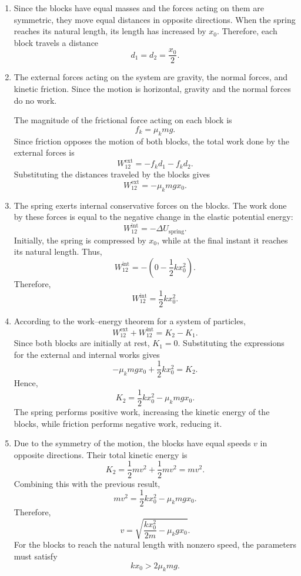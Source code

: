 \documentclass[12pt]{article}
\begin{document}
\begin{enumerate}
    \item Since the blocks have equal masses and the forces acting on them are symmetric, they move equal distances in opposite directions. When the spring reaches its natural length, its length has increased by $x_0$. Therefore, each block travels a distance
    \[
        \boxed{d_1=d_2=\frac{x_0}{2}.}
    \]

    \item The external forces acting on the system are gravity, the normal forces, and kinetic friction. Since the motion is horizontal, gravity and the normal forces do no work.

    The magnitude of the frictional force acting on each block is
    \[
        f_k=\mu_k mg.
    \]
    Since friction opposes the motion of both blocks, the total work done by the external forces is
    \[
        W_{12}^{\mathrm{ext}}
        =-f_kd_1-f_kd_2.
    \]
    Substituting the distances traveled by the blocks gives
    \[
        \boxed{W_{12}^{\mathrm{ext}}=-\mu_k mgx_0.}
    \]

    \item The spring exerts internal conservative forces on the blocks. The work done by these forces is equal to the negative change in the elastic potential energy:
    \[
        W_{12}^{\mathrm{int}}=-\Delta U_{\mathrm{spring}}.
    \]
    Initially, the spring is compressed by $x_0$, while at the final instant it reaches its natural length. Thus,
    \[
        W_{12}^{\mathrm{int}}
        =-\left(0-\frac{1}{2}kx_0^2\right).
    \]
    Therefore,
    \[
        \boxed{W_{12}^{\mathrm{int}}=\frac{1}{2}kx_0^2.}
    \]

    \item According to the work--energy theorem for a system of particles,
    \[
        W_{12}^{\mathrm{ext}}+W_{12}^{\mathrm{int}}
        =K_2-K_1.
    \]
    Since both blocks are initially at rest, $K_1=0$. Substituting the expressions for the external and internal works gives
    \[
        -\mu_k mgx_0+\frac{1}{2}kx_0^2=K_2.
    \]
    Hence,
    \[
        \boxed{K_2=\frac{1}{2}kx_0^2-\mu_k mgx_0.}
    \]
    The spring performs positive work, increasing the kinetic energy of the blocks, while friction performs negative work, reducing it.

    \item Due to the symmetry of the motion, the blocks have equal speeds $v$ in opposite directions. Their total kinetic energy is
    \[
        K_2=\frac{1}{2}mv^2+\frac{1}{2}mv^2=mv^2.
    \]
    Combining this with the previous result,
    \[
        mv^2=\frac{1}{2}kx_0^2-\mu_k mgx_0.
    \]
    Therefore,
    \[
        \boxed{v=\sqrt{\frac{kx_0^2}{2m}-\mu_k gx_0}.}
    \]
    For the blocks to reach the natural length with nonzero speed, the parameters must satisfy
    \[
        kx_0>2\mu_k mg.
    \]


\end{enumerate}
\end{document}
